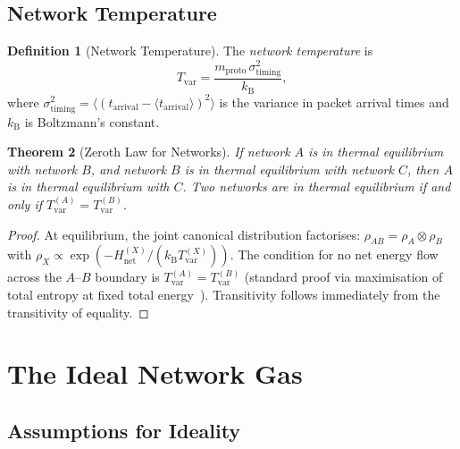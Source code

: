 \documentclass[11pt,twocolumn,a4paper]{article}
\newtheorem{theorem}{Theorem}[section]
\theoremstyle{definition}
\newtheorem{definition}[theorem]{Definition}
\theoremstyle{remark}
\newcommand{\kB}{k_{\mathrm{B}}}
\newcommand{\Tvar}{T_{\mathrm{var}}}
\newcommand{\mpr}{m_{\mathrm{proto}}}
\newcommand{\sigtime}{\sigma^{2}_{\mathrm{timing}}}
\newcommand{\Hnet}{H_{\mathrm{net}}}
\newcommand{\avg}[1]{\langle #1 \rangle}
\begin{document}
\subsection{Network Temperature}\label{sec:temperature}

\begin{definition}[Network Temperature]\label{def:temperature}
The \emph{network temperature} is
\begin{equation}\label{eq:temperature}
  \Tvar = \frac{\mpr\,\sigtime}{\kB},
\end{equation}
where $\sigtime=\avg{(t_{\mathrm{arrival}}-\avg{t_{\mathrm{arrival}}})^2}$ is
the variance in packet arrival times and $\kB$ is Boltzmann's constant.
\end{definition}

\begin{theorem}[Zeroth Law for Networks]\label{thm:zeroth}
If network $A$ is in thermal equilibrium with network $B$, and network $B$
is in thermal equilibrium with network $C$, then $A$ is in thermal
equilibrium with $C$.  Two networks are in thermal equilibrium if and only
if $\Tvar^{(A)}=\Tvar^{(B)}$.
\end{theorem}

\begin{proof}
At equilibrium, the joint canonical distribution factorises:
$\rho_{AB}=\rho_A\otimes\rho_B$ with
$\rho_X\propto\exp(-\Hnet^{(X)}/(\kB\Tvar^{(X)}))$.  The condition for
no net energy flow across the $A$--$B$ boundary is $\Tvar^{(A)}=\Tvar^{(B)}$
(standard proof via maximisation of total entropy at fixed total
energy~\cite{Callen1985}).  Transitivity follows immediately from the
transitivity of equality.
\end{proof}

\section{The Ideal Network Gas}\label{sec:ideal}

\subsection{Assumptions for Ideality}\label{sec:ideal_assumptions}
\end{document}
